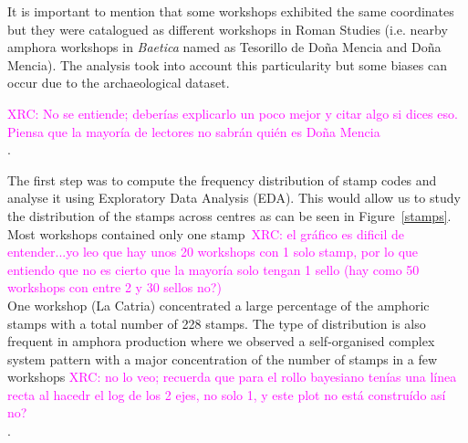 \documentclass[review]{elsarticle}
\newcommand{\memo}[2]{\textcolor{#1}{#2}}
\newcommand{\xavi}[1]{\memo{magenta}{XRC: #1\\}}
\begin{document}

It is important to mention that some workshops exhibited the same coordinates but they were catalogued as different workshops in Roman Studies (i.e. nearby amphora workshops in \textit{Baetica} named as Tesorillo de Doña Mencia and Doña Mencia). The analysis took into account this particularity but some biases can occur due to the archaeological dataset. 

\xavi{No se entiende; deberías explicarlo un poco mejor y citar algo si dices eso. Piensa que la mayoría de lectores no sabrán quién es Doña Mencia}. 

The first step was to compute the frequency distribution of stamp codes and analyse it using Exploratory Data Analysis (EDA). This would allow us to study the distribution of the stamps across centres as can be seen in Figure~\ref{stamps}. Most workshops contained only one stamp~\xavi{el gráfico es dificil de entender...yo leo que hay unos 20 workshops con 1 solo stamp, por lo que entiendo que no es cierto que la mayoría solo tengan 1 sello (hay como 50 workshops con entre 2 y 30 sellos no?)} One workshop (La Catria) concentrated a large percentage of the amphoric stamps with a total number of 228 stamps. The type of distribution is also frequent in amphora production where we observed a self-organised complex system pattern with a major concentration of the number of stamps in a few workshops \citep{bayesian_2018,coto-sarmiento_identifying_2018}\xavi{no lo veo; recuerda que para el rollo bayesiano tenías una línea recta al hacedr el log de los 2 ejes, no solo 1, y este plot no está construído así no?}.


\end{document}
